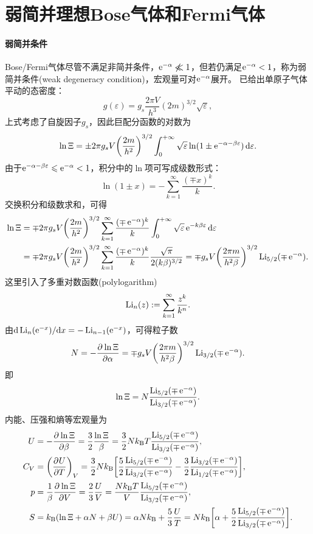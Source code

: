 \section{弱简并理想Bose气体和Fermi气体}
\label{sec:weak degeneracy}

\paragraph{弱简并条件}

Bose/Fermi气体尽管不满足非简并条件，$\mathop{}\!\mathrm{e}^{-\alpha}\not\ll 1$，但若仍满足$\mathop{}\!\mathrm{e}^{-\alpha}<1$，称为弱简并条件(weak degeneracy condition)，宏观量可对$\mathop{}\!\mathrm{e}^{-\alpha}$展开。
 已给出单原子气体平动的态密度：
\[
	g(\varepsilon)=g_s\frac{2\pi V}{h^3}(2m)^{3/2}\sqrt\varepsilon,
\]
上式考虑了自旋因子$g_s$，因此巨配分函数的对数为
\[
	\ln\Xi=\pm 2\pi g_sV\biggl(\frac{2m}{h^2}\biggr)^{3/2}\int_0^{+\infty}\sqrt\varepsilon\ln(1\pm\mathop{}\!\mathrm{e}^{-\alpha-\beta\varepsilon})\mathop{}\!\mathrm{d}\varepsilon.
\]
由于$\mathop{}\!\mathrm{e}^{-\alpha-\beta\varepsilon}\leqslant\mathop{}\!\mathrm{e}^{-\alpha}<1$，积分中的$\ln$项可写成级数形式：
\[
	\ln(1\pm x)=-\sum_{k=1}^\infty\frac{(\mp x)^k}k.
\]
交换积分和级数求和，可得
\begin{align*}
	\ln\Xi
	&=\mp 2\pi g_sV\biggl(\frac{2m}{h^2}\biggr)^{3/2}\sum_{k=1}^\infty\frac{(\mp\mathop{}\!\mathrm{e}^{-\alpha})^k}{k}\int_0^{+\infty}\sqrt\varepsilon\mathop{}\!\mathrm{e}^{-k\beta\varepsilon}\mathop{}\!\mathrm{d}\varepsilon\\
	&=\mp 2\pi g_sV\biggl(\frac{2m}{h^2}\biggr)^{3/2}\sum_{k=1}^\infty\frac{(\mp\mathop{}\!\mathrm{e}^{-\alpha})^k}{k}\frac{\sqrt\pi}{2(k\beta)^{3/2}}
	=\mp g_sV\biggl(\frac{2\pi m}{h^2\beta}\biggr)^{3/2}\operatorname{Li}_{5/2}(\mp\mathop{}\!\mathrm{e}^{-\alpha}).
\end{align*}
这里引入了多重对数函数(polylogarithm)
\begin{equation}
	\operatorname{Li}_n(z):=\sum_{k=1}^\infty\frac{z^k}{k^n}.
\end{equation}
由$\mathop{}\!\mathrm{d}\operatorname{Li}_n(\mathop{}\!\mathrm{e}^{-x})/\mathrm{d} x=-\operatorname{Li}_{n-1}(\mathop{}\!\mathrm{e}^{-x})$，可得粒子数
\[
	N=-\frac{\partial^{{}}\ln\Xi}{\partial{\alpha}^{{}}}=\mp g_sV\biggl(\frac{2\pi m}{h^2\beta}\biggr)^{3/2}\operatorname{Li}_{3/2}(\mp\mathop{}\!\mathrm{e}^{-\alpha}).
\]
即
\[
	\ln\Xi=N\frac{\operatorname{Li}_{5/2}(\mp\mathop{}\!\mathrm{e}^{-\alpha})}{\operatorname{Li}_{3/2}(\mp\mathop{}\!\mathrm{e}^{-\alpha})}.
\]
内能、压强和熵等宏观量为
\begin{subequations}
	\begin{align}
		U&=-\pv{\ln\Xi}\beta=\frac32\frac{\ln\Xi}\beta=\frac32N\kB T\frac{\Li_{5/2}(\mp\e{-\alpha})}{\Li_{3/2}(\mp\e{-\alpha})},\\
		C_V&=\pu[V]UT=\frac32N\kB\biggfkh{\frac{5}2\frac{\Li_{5/2}(\mp\e{-\alpha})}{\Li_{3/2}(\mp\e{-\alpha})}-\frac32\frac{\Li_{3/2}(\mp\e{-\alpha})}{\Li_{1/2}(\mp\e{-\alpha})}},\\
		p&=\frac1\beta\pv{\ln\Xi}V=\frac23\frac UV=\frac{N\kB T}V\frac{\Li_{5/2}(\mp\e{-\alpha})}{\Li_{3/2}(\mp\e{-\alpha})},\\
		S&=\kB(\ln\Xi+\alpha N+\beta U)=\alpha N\kB+\frac53\frac UT=N\kB\biggfkh{\alpha+\frac52\frac{\Li_{5/2}(\mp\e{-\alpha})}{\Li_{3/2}(\mp\e{-\alpha})}}.
	\end{align}
\end{subequations}

